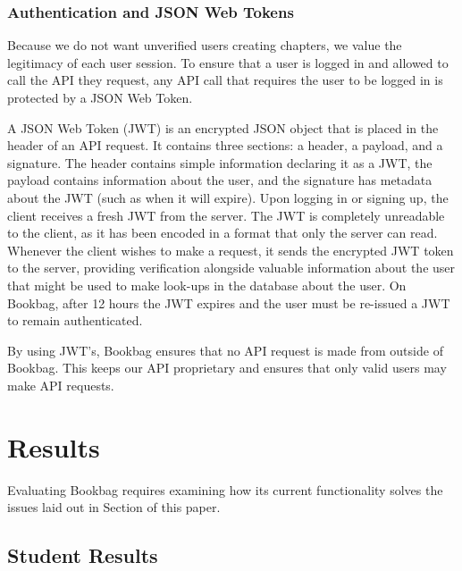 \documentclass[pageno]{jpaper}
\begin{document}
\subsubsection{Authentication and JSON Web Tokens}

Because we do not want unverified users creating chapters, we value the legitimacy of each user session. To ensure that a user is logged in and allowed to call the API they request, any API call that requires the user to be logged in is protected by a JSON Web Token.

A JSON Web Token (JWT) is an encrypted JSON object that is placed in the header of an API request. It contains three sections: a header, a payload, and a signature. The header contains simple information declaring it as a JWT, the payload contains information about the user, and the signature has metadata about the JWT (such as when it will expire). Upon logging in or signing up, the client receives a fresh JWT from the server. The JWT is completely unreadable to the client, as it has been encoded in a format that only the server can read. Whenever the client wishes to make a request, it sends the encrypted JWT token to the server, providing verification alongside valuable information about the user that might be used to make look-ups in the database about the user. On Bookbag, after 12 hours the JWT expires and the user must be re-issued a JWT to remain authenticated.

By using JWT's, Bookbag ensures that no API request is made from outside of Bookbag. This keeps our API proprietary and ensures that only valid users may make API requests.






\section{Results} \label{results}

Evaluating Bookbag requires examining how its current functionality solves the issues laid out in Section \label{intro} of this paper.

\subsection{Student Results}
\end{document}
